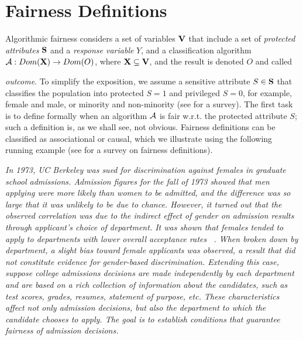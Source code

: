 \documentclass[11pt]{article}
\begin{document}
\section{Fairness Definitions}
\label{sec:fairness}
Algorithmic fairness considers a set of variables ${\mathbf{V}}$ that include a set of {\em protected attributes} ${\mathbf{S}}$ %
and a {\em response variable} $Y$, and a  classification algorithm
$\mathcal{A} : Dom({\mathbf{X}}) \rightarrow Dom(O)$, where ${\mathbf{X}} \subseteq {\mathbf{V}}$,
and the result is denoted $O$
and called {\em outcome}.  To simplify the exposition, we
assume a sensitive attribute $S \in {\mathbf{S}}$ that classifies the population into protected $S=1$ and
privileged $S=0$, for example, female and male, or minority and non-minority (see \cite{zliobaite2015survey2} for a survey). %
The first task is to define formally when an algorithm $\mathcal{A}$ is fair w.r.t. the protected attribute $S$; such a definition is, as we shall see, not obvious.  Fairness definitions
can be classified as associational or causal, which we illustrate using the following running example (see \cite{verma2018fairness} for a survey on fairness definitions).

\begin{example} \em \label{ex:berkeley}
In 1973, UC Berkeley was sued for discrimination against
females in graduate school admissions. Admission figures for the fall of 1973 showed that men applying were more likely than women to be admitted, and
the difference was so large that it was unlikely to be due to chance.
However, it turned out that the observed correlation was due to the indirect effect of gender on admission results through applicant's choice of department. It was shown that 
	females tended to apply to departments with lower overall
	acceptance rates ~\cite{salimi2018bias}. %
	When broken down by department,  a slight bias toward female applicants
	was observed, a result that did not constitute evidence for gender-based discrimination. Extending this case, suppose college admissions decisions are made
	independently by each department and are based on a rich collection
	of information about the candidates, such as test scores, grades,
resumes, statement of purpose, etc.  These characteristics affect not
	only admission decisions, but also the department to which the
	candidate chooses to apply. The goal is to establish  conditions that guarantee fairness of admission decisions.
\end{example}
\end{document}
